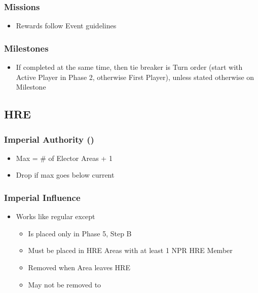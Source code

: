 \documentclass[10pt]{article}
\begin{document}
\subsubsection*{Missions }
\begin{itemize}
	\item Rewards follow Event guidelines
\end{itemize}

\subsubsection*{Milestones }
\begin{itemize}
	\item If completed at the same time, then tie breaker is Turn order (start with Active Player in Phase 2, otherwise First Player), unless stated otherwise on Milestone
\end{itemize}

\subsection*{HRE }
\subsubsection*{Imperial Authority (\authority) }
\begin{itemize}
	\item Max \authority = \# of Elector Areas + 1
	\item Drop \authority if max \authority goes below current \authority
\end{itemize}

\subsubsection*{Imperial Influence }
\begin{itemize}
	\item Works like regular \influence except
	\begin{itemize}
		\item Is placed only in Phase 5, Step B
		\item Must be placed in HRE Areas with at least 1 NPR HRE Member
		\item Removed when Area leaves HRE
		\item May not be removed to 
	\end{itemize}
\end{itemize}
\end{document}
